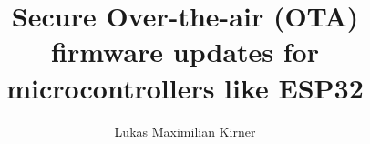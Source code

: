 \documentclass[acmsmall,screen,nonacm]{acmart}
\title{Secure Over-the-air (OTA) firmware updates for microcontrollers like ESP32}
\author{Lukas Maximilian Kirner}
\begin{document}
 
\maketitle





\newpage

\newpage


\bigskip


\end{document}

